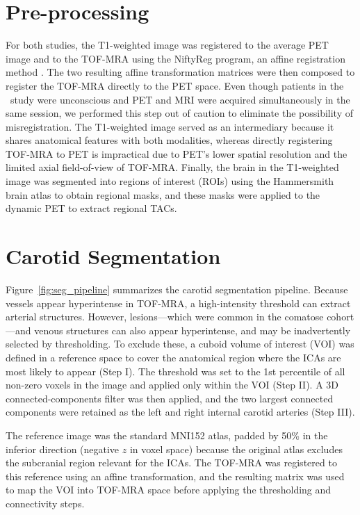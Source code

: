 \section{Pre-processing}
For both studies, the T1-weighted image was registered to the average PET image and to the TOF-MRA using the NiftyReg program, an affine registration method \cite{modat2014global}.
The two resulting affine transformation matrices were then composed to register the TOF-MRA directly to the PET space.
Even though patients in the \fdg\ study were unconscious and PET and MRI were acquired simultaneously in the same session, we performed this step out of caution to eliminate the possibility of misregistration.
The T1-weighted image served as an intermediary because it shares anatomical features with both modalities, whereas directly registering TOF-MRA to PET is impractical due to PET’s lower spatial resolution and the limited axial field-of-view of TOF-MRA.
Finally, the brain in the T1-weighted image was segmented into regions of interest (ROIs) using the Hammersmith brain atlas \cite{hammers2003three} to obtain regional masks, and these masks were applied to the dynamic PET to extract regional TACs.


\section{Carotid Segmentation\label{sec:carotid}}
Figure~\ref{fig:seg_pipeline} summarizes the carotid segmentation pipeline.
Because vessels appear hyperintense in TOF-MRA, a high-intensity threshold can extract arterial structures.
However, lesions—which were common in the comatose cohort—and venous structures can also appear hyperintense, and may be inadvertently selected by thresholding.
To exclude these, a cuboid volume of interest (VOI) was defined in a reference space to cover the anatomical region where the ICAs are most likely to appear (Step I).
The threshold was set to the 1st percentile of all non-zero voxels in the image and applied only within the VOI (Step II).
A 3D connected-components filter was then applied, and the two largest connected components were retained as the left and right internal carotid arteries (Step III).

The reference image was the standard MNI152 atlas, padded by 50\% in the inferior direction (negative \(z\) in voxel space) because the original atlas excludes the subcranial region relevant for the ICAs.
The TOF-MRA was registered to this reference using an affine transformation, and the resulting matrix was used to map the VOI into TOF-MRA space before applying the thresholding and connectivity steps.

